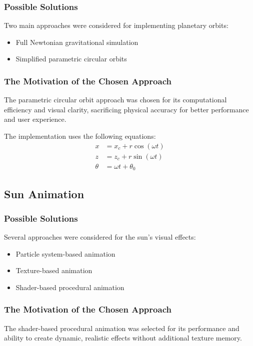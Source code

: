 \documentclass[12pt]{report}
\begin{document}
\subsubsection{Possible Solutions}
Two main approaches were considered for implementing planetary orbits:
\begin{itemize}
    \item Full Newtonian gravitational simulation
    \item Simplified parametric circular orbits\cite{kepler_orbits}
\end{itemize}

\subsubsection{The Motivation of the Chosen Approach}
The parametric circular orbit approach was chosen for its computational efficiency and visual clarity, sacrificing physical accuracy for better performance and user experience.

The implementation uses the following equations:
\begin{equation}
\begin{aligned}
x &= x_c + r \cos(\omega t) \\
z &= z_c + r \sin(\omega t) \\
\theta &= \omega t + \theta_0
\end{aligned}
\end{equation}

\subsection{Sun Animation}
\subsubsection{Possible Solutions}
Several approaches were considered for the sun's visual effects:
\begin{itemize}
    \item Particle system-based animation
    \item Texture-based animation
    \item Shader-based procedural animation\cite{graphics_shaders}
\end{itemize}

\subsubsection{The Motivation of the Chosen Approach}
The shader-based procedural animation was selected for its performance and ability to create dynamic, realistic effects without additional texture memory.
\end{document}
